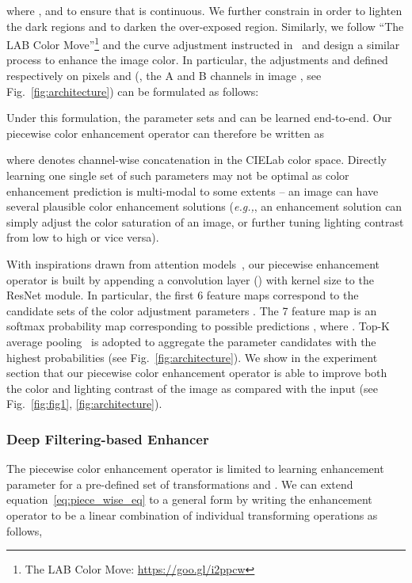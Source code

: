 \documentclass[sigconf]{acmart}
\newcommand{\eg}{\textit{e.g.,}}
\begin{document}
where ,  and  to ensure that  is continuous. We further constrain  in order to lighten the dark regions and  to darken the over-exposed region. Similarly, we follow ``The LAB Color Move''\footnote{The LAB Color Move: \url{https://goo.gl/i2ppcw}} and the curve adjustment instructed in~\cite{hosie2011new} and design a similar process to enhance the image color. In particular, the adjustments  and  defined respectively on pixels  and  (\ie, the A and B channels in image , see Fig.~\ref{fig:architecture}) can be formulated as follows:


Under this formulation, the parameter sets  and  can be learned end-to-end. Our piecewise color enhancement operator can therefore be written as
 
where  denotes channel-wise concatenation in the CIELab color space. Directly learning one single set of such parameters may not be optimal as color enhancement prediction is multi-modal to some extents -- an image can have several plausible color enhancement solutions (\eg, an enhancement solution can simply adjust the color saturation of an image, or further tuning lighting contrast from low to high or vice versa). 

With inspirations drawn from attention models~\cite{xu2015show}, our piecewise enhancement operator is built by appending a convolution layer () with kernel size  to the ResNet module.
In particular, the first 6 feature maps correspond to the candidate sets of the color adjustment parameters .
The 7 feature map is an  softmax probability map corresponding to  possible predictions , where . Top-K average pooling~\cite{wang2017untrimmednets} is adopted to aggregate the parameter candidates with the highest probabilities (see Fig.~\ref{fig:architecture}). 
We show in the experiment section that our piecewise color enhancement operator is able to improve both the color and lighting contrast of the image as compared with the input (see Fig.~\ref{fig:fig1}, \ref{fig:architecture}).




\subsubsection{Deep Filtering-based Enhancer}
\label{subsubsec:deep_filtering}
The piecewise color enhancement operator is limited to learning enhancement parameter  for a pre-defined set of transformations  and . We can extend equation~\eqref{eq:piece_wise_eq} to a general form by writing the enhancement operator  to be a linear combination of individual transforming operations  as follows,
\end{document}
